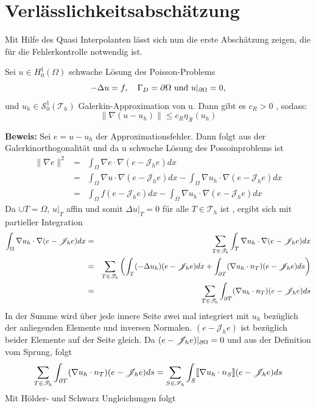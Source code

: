 \section{Verlässlichkeitsabschätzung}
Mit Hilfe des Quasi Interpolanten lässt sich nun die erste Abschätzung zeigen, die für die Fehlerkontrolle notwendig ist.
\begin{theorem}[Verlässlichkeitsabschätzung]
	Sei $u\in H^1_0(\Omega)$ schwache Lösung des Poisson-Problems \[-\Delta u = f ,\quad \Gamma_D = \partial \Omega \text{ und } u|_{\partial \Omega} = 0, \] und $u_h \in \mathscr{S}^1_0(\mathscr{T}_h)$ Galerkin-Approximation von u. Dann gibt es $c_R > 0$ , sodass:
	\[\|\nabla(u-u_h)\|\leq c_R\eta_\mathscr{R}(u_h)
	\]
\end{theorem}
\textbf{Beweis:}
Sei $e = u-u_h$ der Approximationsfehler. Dann folgt aus der Galerkinorthogonalität und da u schwache Lösung des Possoinproblems ist
\begin{eqnarray*}
	\|\nabla e\|^2 &=& \int_{\Omega}\nabla e \cdot \nabla (e-\mathscr{J}_he)dx \\
	&=&\int_{\Omega} \nabla u \cdot \nabla (e-\mathscr{J}_he)dx -\int_{\Omega} \nabla u_h \cdot \nabla (e-\mathscr{J}_he)dx \\
	&=&\int_{\Omega} f (e-\mathscr{J}_he)dx -\int_{\Omega} \nabla u_h \cdot \nabla (e-\mathscr{J}_he)dx
\end{eqnarray*}
Da $\cup T = \Omega$,  $u|_T$ affin und somit $\Delta u|_T=0$ für alle $T\in\mathscr{T}_h$ ist , ergibt sich mit partieller Integration
\begin{eqnarray*}
	\int_{\Omega}\nabla u_h\cdot\nabla (e-\mathscr{J}_he) dx &=& \sum_{T\in\mathscr{T}_h} \int_{T} \nabla u_h \cdot \nabla (e-\mathscr{J}_he) dx \\
	&=& \sum_{T\in\mathscr{T}_h} \left(\int_{T} (-\Delta u_h) (e-\mathscr{J}_he) dx +\int_{\partial T} (\nabla u_h \cdot n_T) (e-\mathscr{J}_he) ds\right) \\
	&=&\sum_{T\in\mathscr{T}_h} \int_{\partial T} (\nabla u_h \cdot n_T) (e-\mathscr{J}_he) ds
\end{eqnarray*}
In der Summe wird über jede innere Seite zwei mal integriert mit $u_h$ bezüglich der anliegenden Elemente und inversen Normalen. $(e-\mathscr{J}_he)$ ist bezüglich beider Elemente auf der Seite gleich. Da $(e-\mathscr{J}_he)|_{\partial \Omega}=0$ und aus der Definition vom Sprung, folgt
\[
\sum_{T\in\mathscr{T}_h} \int_{\partial T} (\nabla u_h \cdot n_T) (e-\mathscr{J}_he) ds =
\sum_{S\in\mathscr{S}_h} \int_{S} \llbracket \nabla u_h \cdot n_S\rrbracket (e-\mathscr{J}_he) ds
\]
Mit Hölder- und Schwarz Ungleichungen folgt
